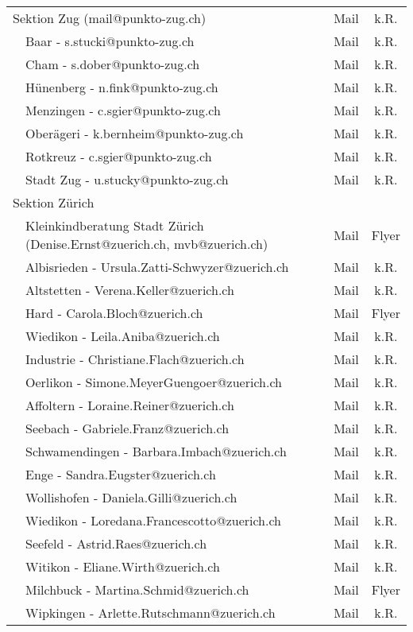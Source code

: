 \begin{longtable}[htbp]{|p{0.2em} p{20em} | c | c |}
  \multicolumn{2}{|l|}{Sektion Zug (mail@punkto-zug.ch)} & Mail & k.R.\\
  & Baar - s.stucki@punkto-zug.ch & Mail & k.R.\\
  & Cham - s.dober@punkto-zug.ch & Mail & k.R.\\
  & Hünenberg - n.fink@punkto-zug.ch & Mail & k.R.\\
  & Menzingen - c.sgier@punkto-zug.ch & Mail & k.R.\\
  & Oberägeri - k.bernheim@punkto-zug.ch & Mail & k.R.\\
  & Rotkreuz - c.sgier@punkto-zug.ch & Mail & k.R.\\
  & Stadt Zug - u.stucky@punkto-zug.ch & Mail & k.R.\\
  \multicolumn{2}{|l|}{Sektion Zürich} &  & \\
  & Kleinkindberatung Stadt Zürich (Denise.Ernst@zuerich.ch, mvb@zuerich.ch) & Mail & Flyer\\
  & Albisrieden - Ursula.Zatti-Schwyzer@zuerich.ch & Mail & k.R.\\
  & Altstetten - Verena.Keller@zuerich.ch & Mail & k.R.\\
  & Hard - Carola.Bloch@zuerich.ch & Mail & Flyer\\
  & Wiedikon - Leila.Aniba@zuerich.ch & Mail & k.R.\\
  & Industrie - Christiane.Flach@zuerich.ch & Mail & k.R.\\
  & Oerlikon - Simone.MeyerGuengoer@zuerich.ch & Mail & k.R.\\
  & Affoltern - Loraine.Reiner@zuerich.ch & Mail & k.R.\\
  & Seebach - Gabriele.Franz@zuerich.ch & Mail & k.R.\\
  & Schwamendingen  - Barbara.Imbach@zuerich.ch & Mail & k.R.\\
  & Enge - Sandra.Eugster@zuerich.ch & Mail & k.R.\\
  & Wollishofen - Daniela.Gilli@zuerich.ch & Mail & k.R.\\
  & Wiedikon - Loredana.Francescotto@zuerich.ch & Mail & k.R.\\
  & Seefeld - Astrid.Raes@zuerich.ch & Mail & k.R.\\
  & Witikon -  Eliane.Wirth@zuerich.ch & Mail & k.R.\\
  & Milchbuck - Martina.Schmid@zuerich.ch & Mail & Flyer\\
  & Wipkingen - Arlette.Rutschmann@zuerich.ch & Mail & k.R.\\
\end{longtable}

